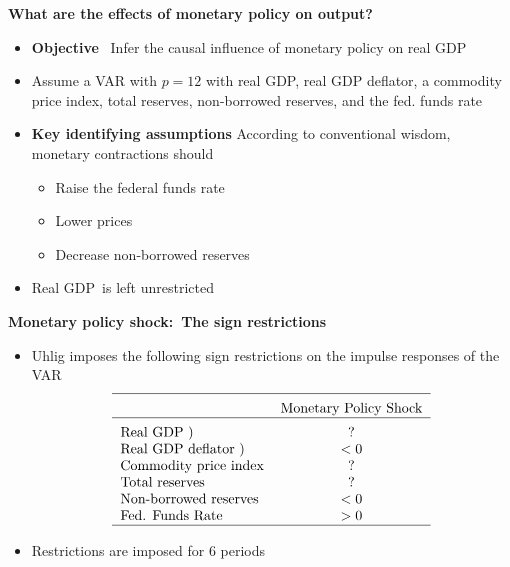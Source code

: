 \documentclass[10pt,english,t,aspectratio=169,ignorenonframetext]{beamer}
\begin{document}
\begin{frame}
{\textbf{What are the effects of monetary policy on output?}}\medskip

\begin{itemize}
\item \textbf{Objective} \ Infer the causal influence of monetary policy on
real GDP\bigskip \pause

\item Assume a VAR with $p=12$ with real GDP, real GDP deflator, a commodity
price index, total reserves, non-borrowed reserves, and the fed. funds
rate\bigskip

\item \textbf{Key identifying assumptions} According to conventional wisdom,
monetary contractions should\smallskip

\begin{itemize}
\item Raise the federal funds rate\smallskip

\item Lower prices\smallskip

\item Decrease non-borrowed reserves\bigskip
\end{itemize}

\item Real GDP\ is left unrestricted
\end{itemize}
\end{frame}


\begin{frame}
{\textbf{Monetary policy shock:\ The sign restrictions}}\bigskip

\begin{itemize}
\item Uhlig imposes the following sign restrictions on the impulse responses
of the VAR%
\begin{equation*}
\begin{tabular}{lc}
\hline
\addlinespace & Monetary Policy Shock \\ \hline
\addlinespace Real GDP ) & ? \\ 
Real GDP\ deflator ) & $<0$ \\ 
Commodity price index & ? \\ 
Total reserves & ? \\ 
Non-borrowed reserves & $<0$ \\ 
Fed. Funds Rate & $>0$ \\ \hline
\end{tabular}%
\end{equation*}%
\bigskip

\item Restrictions are imposed for $6$ periods
\end{itemize}
\end{frame}
\end{document}
